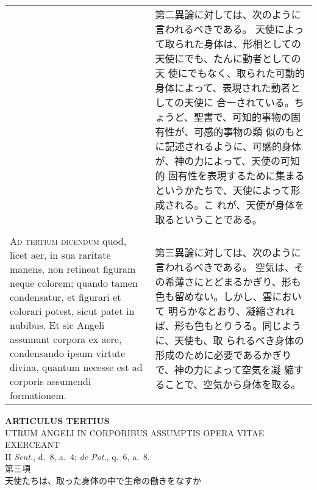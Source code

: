 \documentclass[10pt]{jsarticle} %
\begin{document}
\begin{longtable}{p{21em}p{21em}}
&

第二異論に対しては、次のように言われるべきである。
天使によって取られた身体は、形相としての天使にでも、たんに動者としての天
 使にでもなく、取られた可動的身体によって、表現された動者としての天使に
 合一されている。ちょうど、聖書で、可知的事物の固有性が、可感的事物の類
 似のもとに記述されるように、可感的身体が、神の力によって、天使の可知的
 固有性を表現するために集まるというかたちで、天使によって形成される。こ
 れが、天使が身体を取るということである。


\\\\


{\scshape Ad tertium dicendum} quod, licet aer, in sua
raritate manens, non retineat figuram neque colorem; quando tamen
condensatur, et figurari et colorari potest, sicut patet in nubibus. Et
sic Angeli assumunt corpora ex aere, condensando ipsum virtute divina,
quantum necesse est ad corporis assumendi formationem.

&

第三異論に対しては、次のように言われるべきである。
空気は、その希薄さにとどまるかぎり、形も色も留めない。しかし、雲において
 明らかなとおり、凝縮されれば、形も色もとりうる。同じように、天使も、取
 られるべき身体の形成のために必要であるかぎりで、神の力によって空気を凝
 縮することで、空気から身体を取る。


\end{longtable}
\newpage



\begin{center}
 {\Large {\bf ARTICULUS TERTIUS}}\\
 {\large UTRUM ANGELI IN CORPORIBUS ASSUMPTIS OPERA VITAE EXERCEANT}\\
 {\footnotesize II {\itshape Sent.}, d.~8, a.~4; {\itshape de Pot.},
 q.~6, a.~8.}\\
 {\Large 第三項\\天使たちは、取った身体の中で生命の働きをなすか}
\end{center}
\end{document}
